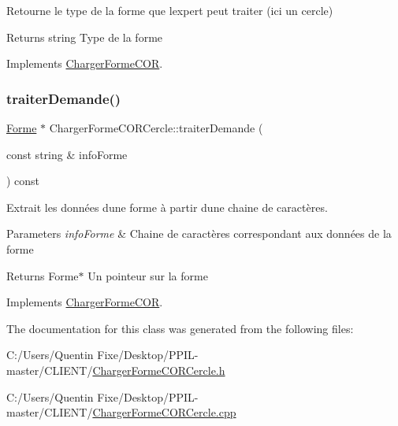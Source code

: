 Retourne le type de la forme que l\textquotesingle{}expert peut traiter (ici un cercle) 

\begin{DoxyReturn}{Returns}
string Type de la forme 
\end{DoxyReturn}


Implements \hyperlink{class_charger_forme_c_o_r_ae740eabcd9b3cc3809c1fe5ffd0100a1}{Charger\+Forme\+C\+OR}.

\mbox{\label{class_charger_forme_c_o_r_cercle_ad65cbf0176ef4a65b44c5782646e45fa}} 
\subsubsection{\texorpdfstring{traiter\+Demande()}{traiterDemande()}}
{\footnotesize\ttfamily \hyperlink{class_forme}{Forme} $\ast$ Charger\+Forme\+C\+O\+R\+Cercle\+::traiter\+Demande (\begin{DoxyParamCaption}\item[{const string \&}]{info\+Forme }\end{DoxyParamCaption}) const\hspace{0.3cm}{\ttfamily [virtual]}}



Extrait les données d\textquotesingle{}une forme à partir d\textquotesingle{}une chaine de caractères. 


\begin{DoxyParams}{Parameters}
{\em info\+Forme} & Chaine de caractères correspondant aux données de la forme \\
\hline
\end{DoxyParams}
\begin{DoxyReturn}{Returns}
Forme$\ast$ Un pointeur sur la forme 
\end{DoxyReturn}


Implements \hyperlink{class_charger_forme_c_o_r_a1d9563c3a1ff9d6d86aa87a83bdaf8da}{Charger\+Forme\+C\+OR}.



The documentation for this class was generated from the following files\+:\begin{DoxyCompactItemize}
\item 
C\+:/\+Users/\+Quentin Fixe/\+Desktop/\+P\+P\+I\+L-\/master/\+C\+L\+I\+E\+N\+T/\hyperlink{_charger_forme_c_o_r_cercle_8h}{Charger\+Forme\+C\+O\+R\+Cercle.\+h}\item 
C\+:/\+Users/\+Quentin Fixe/\+Desktop/\+P\+P\+I\+L-\/master/\+C\+L\+I\+E\+N\+T/\hyperlink{_charger_forme_c_o_r_cercle_8cpp}{Charger\+Forme\+C\+O\+R\+Cercle.\+cpp}\end{DoxyCompactItemize}
